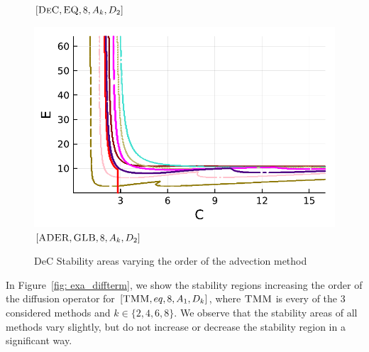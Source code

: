 \begin{figure}[!h]
\begin{minipage}[t]{0.32\textwidth}
		\centering
		$[\textsc{DeC},\textsc{EQ},8, A_k,D_2]$
	\end{minipage}
	\begin{minipage}[t]{0.32\textwidth}
	\includegraphics[width=\textwidth]{pdf/pdepics/diff/IMEXADER_gaussLobatto_adv_ord_1-8.pdf}
	\centering
	$[\textsc{ADER},\textsc{GLB},8, A_k,D_2]$
\end{minipage}
	\caption{DeC Stability areas varying the order of the advection method}
	\label{fig: exa_advterm}
\end{figure}


In Figure~\ref{fig: exa_diffterm}, we show the stability regions increasing the order of the diffusion operator for $[\textsc{TMM},eq, 8, A_1,D_k]$, where $\textsc{TMM}$ is every of the 3 considered methods and $k \in \{2,4,6,8\}$.  We observe that the stability areas of all methods vary slightly, but do not increase or decrease the stability region in a significant way.

